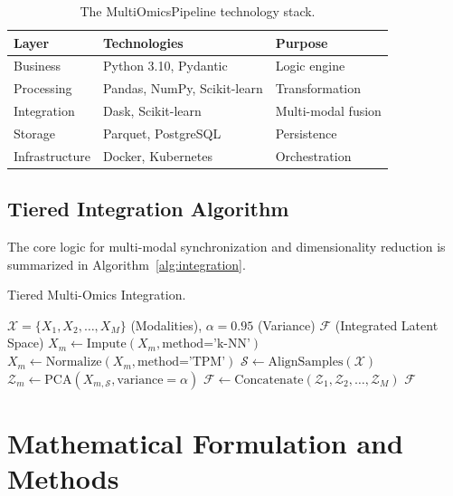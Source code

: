 \documentclass[12pt,a4paper,onecolumn]{article}
\begin{document}
\begin{table}[H]
\caption{The MultiOmicsPipeline technology stack.}\label{tab:stack}
\centering
\small
\setlength{\tabcolsep}{3pt}
\begin{tabularx}{\textwidth}{L L L}
\toprule
\textbf{Layer} & \textbf{Technologies} & \textbf{Purpose} \\
\midrule
Business        & Python 3.10, Pydantic & Logic engine \\
Processing      & Pandas, NumPy, Scikit-learn & Transformation \\
Integration     & Dask, Scikit-learn    & Multi-modal fusion \\
Storage         & Parquet, PostgreSQL   & Persistence \\
Infrastructure  & Docker, Kubernetes    & Orchestration \\
\bottomrule
\end{tabularx}
\end{table}

\subsection{Tiered Integration Algorithm}
The core logic for multi-modal synchronization and dimensionality reduction is summarized in Algorithm~\ref{alg:integration}.

\begin{algorithm}[H]
\caption{Tiered Multi-Omics Integration.}\label{alg:integration}
\begin{algorithmic}[1]
\REQUIRE $\mathcal{X} = \{X_1, X_2, \dots, X_M\}$ (Modalities), $\alpha = 0.95$ (Variance)
\ENSURE $\mathcal{F}$ (Integrated Latent Space)
    \STATE $X_m \gets \text{Impute}(X_m, \text{method='k-NN'})$
    \STATE $X_m \gets \text{Normalize}(X_m, \text{method='TPM'})$
\ENDFOR
\STATE $\mathcal{S} \gets \text{AlignSamples}(\mathcal{X})$
    \STATE $\mathcal{Z}_m \gets \text{PCA}(X_{m, \mathcal{S}}, \text{variance}=\alpha)$
\ENDFOR
\STATE $\mathcal{F} \gets \text{Concatenate}(\mathcal{Z}_1, \mathcal{Z}_2, \dots, \mathcal{Z}_M)$
\RETURN $\mathcal{F}$
\end{algorithmic}
\end{algorithm}

\section{Mathematical Formulation and Methods}
\end{document}
